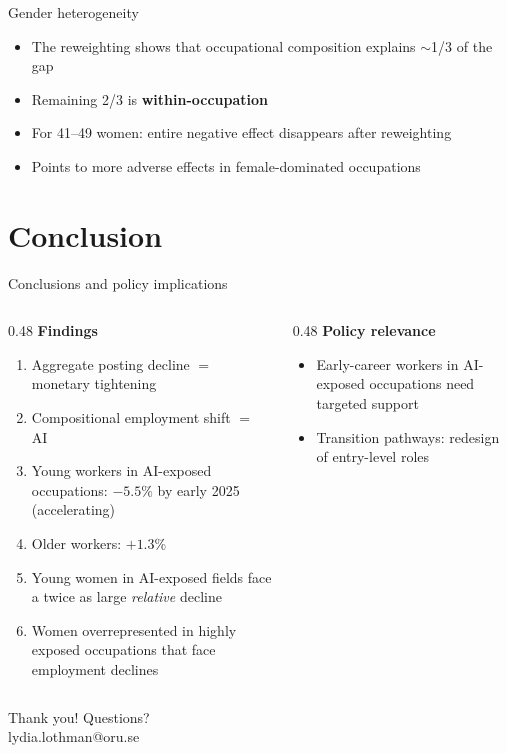 \documentclass[aspectratio=169,11pt]{beamer}
\begin{document}
\begin{frame}{Gender heterogeneity}
\begin{itemize}
\item The reweighting shows that occupational composition explains $\sim$1/3 of the gap
    \item Remaining 2/3 is \textbf{within-occupation}
    \item For 41--49 women: entire negative effect disappears after reweighting
    \item Points to more adverse effects in female-dominated occupations
    \end{itemize}

\end{frame}


\section{Conclusion}

\begin{frame}{Conclusions and policy implications}
\begin{columns}[T]
\begin{column}{0.48\textwidth}
\textbf{Findings}
\begin{enumerate}
    \item Aggregate posting decline $=$ monetary tightening
    \item Compositional employment shift $=$ AI
    \item Young workers in AI-exposed occupations: $-5.5\%$ by early 2025 (accelerating)
    \item Older workers: $+1.3\%$
    \item Young women in AI-exposed fields face a twice as large \textit{relative} decline
    \item Women overrepresented in highly exposed occupations that face employment declines 
\end{enumerate}
\end{column}
\begin{column}{0.48\textwidth}
\textbf{Policy relevance}
\begin{itemize}
    \item Early-career workers in AI-exposed occupations need targeted support
    \item Transition pathways: redesign of entry-level roles
\end{itemize}
\end{column}
\end{columns}
\vspace{2mm}
\begin{center}
\large\textcolor{oruBlue}{Thank you! Questions?}\\[1mm]
\scriptsize lydia.lothman@oru.se
\end{center}
\end{frame}
\end{document}
